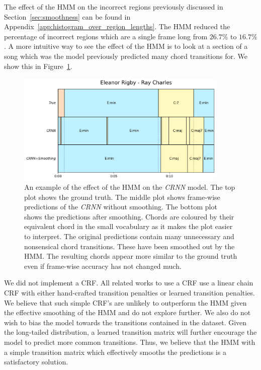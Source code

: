 The effect of the HMM on the incorrect regions previously discussed in Section~\ref{sec:smoothness} can be found in Appendix~\ref{app:histogram_over_region_lengths}. The HMM reduced the percentage of incorrect regions which are a single frame long from $26.7\%$ to $16.7\%$. A more intuitive way to see the effect of the HMM is to look at a section of a song which was the model previously predicted many chord transitions for. We show this in Figure~\ref{fig:hmm_smoothing_example}.

\begin{figure}[H]
    \centering
    \hspace{-1.5cm}
    \includegraphics[width=0.9\textwidth]{figures/hmm_smoothing_example.png}
    \caption{An example of the effect of the HMM on the \emph{CRNN} model. The top plot shows the ground truth. The middle plot shows frame-wise predictions of the \emph{CRNN} without smoothing. The bottom plot shows the predictions after smoothing. Chords are coloured by their equivalent chord in the small vocabulary as it makes the plot easier to interpret. The original predictions contain many unnecessary and nonsensical chord transitions. These have been smoothed out by the HMM. The resulting chords appear more similar to the ground truth even if frame-wise accuracy has not changed much.}\label{fig:hmm_smoothing_example}
\end{figure}

We did not implement a CRF. All related works to use a CRF use a linear chain CRF with either hand-crafted transition penalties or learned transition penalties. We believe that such simple CRF's are unlikely to outperform the HMM given the effective smoothing of the HMM and do not explore further. We also do not wish to bias the model towards the transitions contained in the dataset. Given the long-tailed distribution, a learned transition matrix will further encourage the model to predict more common transitions. Thus, we believe that the HMM with a simple transition matrix which effectively smooths the predictions is a satisfactory solution.

